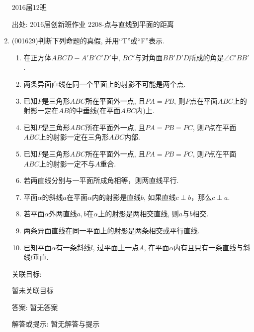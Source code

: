 \documentclass[10pt,a4paper]{article}
\newcommand{\blank}[1]{\underline{\hbox to #1pt{}}}
\begin{document}
\begin{enumerate}[1.]
2016届12班							


出处: 2016届创新班作业	2208-点与直线到平面的距离
\item { (001629)}判断下列命题的真假, 并用``{\rm T}''或``{\rm F}''表示.\\ 
\begin{enumerate}[\blank{30}(1)]
\item 在正方体$ABCD-A'B'C'D'$中, $BC'$与对角面$BB'D'D$所成的角是$\angle C'BB'$.\\ 
\item 两条异面直线在同一个平面上的射影不可能是两个点.\\ 
\item 已知$P$是三角形$ABC$所在平面外一点, 且$PA=PB$, 则$P$点在平面$ABC$上的射影一定在$AB$的中垂线(在平面$ABC$内)上.\\ 
\item 已知$P$是三角形$ABC$所在平面外一点, 且$PA=PB=PC$, 则$P$点在平面$ABC$上的射影一定在三角形$ABC$内部.\\ 
\item 已知$P$是三角形$ABC$所在平面外一点, 且$PA=PB=PC$, 则$P$点在平面$ABC$上的射影一定不与$A$重合.\\ 
\item 若两直线分别与一平面所成角相等，则两直线平行.\\ 
\item 平面$\alpha$的斜线$a$在平面$\alpha$内的射影是直线$b$, 如果直线$c\perp b$，那么$c\perp a$.\\ 
\item 若平面$\alpha$外两直线$a,b$在$\alpha$上的射影是两相交直线, 则$a$与$b$相交.\\ 
\item 两条异面直线在同一平面上的射影是两条相交或平行直线.\\ 
\item 已知平面$\alpha$有一条斜线$l$, 过平面上一点$A$, 在平面$\alpha$内有且只有一条直线与斜线$l$垂直.\\ 
\end{enumerate}


关联目标:

暂未关联目标

答案: 暂无答案

解答或提示: 暂无解答与提示


\end{enumerate}
\end{document}
